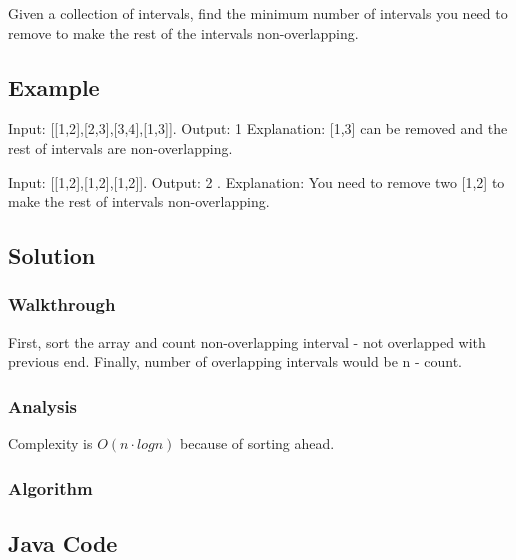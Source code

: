 \documentclass[]{book}
\begin{document}
Given a collection of intervals, find the minimum number of intervals you need to remove to make the rest of the
intervals non-overlapping.

\hypertarget{example-19}{%
\subsection{Example}\label{example-19}}

Input: {[}{[}1,2{]},{[}2,3{]},{[}3,4{]},{[}1,3{]}{]}. Output: 1 Explanation: {[}1,3{]} can be removed and the rest of intervals are
non-overlapping.

Input: {[}{[}1,2{]},{[}1,2{]},{[}1,2{]}{]}. Output: 2 . Explanation: You need to remove two {[}1,2{]} to make the rest of intervals
non-overlapping.

\hypertarget{solution-15}{%
\subsection{Solution}\label{solution-15}}

\hypertarget{walkthrough-19}{%
\subsubsection{Walkthrough}\label{walkthrough-19}}

First, sort the array and count non-overlapping interval - not overlapped with previous end. Finally, number of
overlapping intervals would be n - count.

\hypertarget{analysis-21}{%
\subsubsection{Analysis}\label{analysis-21}}

Complexity is \(O(n \cdot log n)\) because of sorting ahead.

\hypertarget{algorithm-21}{%
\subsubsection{Algorithm}\label{algorithm-21}}

\hypertarget{java-code-17}{%
\subsection{Java Code}\label{java-code-17}}
\end{document}
